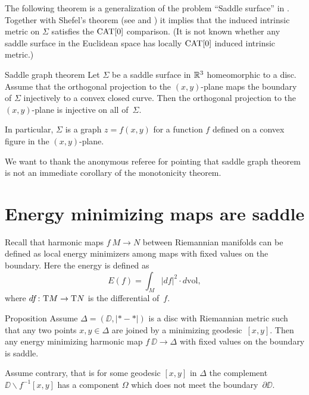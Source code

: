 \documentclass{article}
\begin{document}
The following theorem is a generalization of the problem ``Saddle surface'' in \cite{petrunin-orthodox}.
Together with Shefel's theorem (see \cite{shefel-3D} and \cite[4.5.5]{akp}) it implies that the induced 
intrinsic metric on $\Sigma$ satisfies the $\mathop{\rm CAT}\nolimits[0]$ comparison. 
(It is not known whether any saddle surface in the Euclidean space has locally $\mathop{\rm CAT}\nolimits[0]$ induced intrinsic metric.)

\begin{thm}{Saddle graph theorem}\label{cor:projection}
Let $\Sigma$ be a saddle surface in $\mathbb{R}^3$ homeomorphic to a disc.
Assume that the orthogonal projection to the $(x,y)$-plane
maps the boundary of $\Sigma$
injectively to a convex closed curve.
Then the orthogonal projection to the $(x,y)$-plane is injective on all of~$\Sigma$.

In particular, $\Sigma$ is a graph $z=f(x,y)$ for a function $f$ defined on a convex figure in the $(x,y)$-plane.
\end{thm}

\medskip

We want to thank the anonymous referee for pointing that saddle graph theorem is not an immediate corollary of the monotonicity theorem.

\section{Energy minimizing maps are saddle}

Recall that harmonic maps $f\:M\to N$ between Riemannian manifolds can be defined as local energy minimizers 
among maps with fixed values on the boundary.
Here the energy is defined as 
\[E(f)=\int_M|df|^2\cdot d\mathrm{vol},\]
where $df\colon\mathrm{T} M\to \mathrm{T} N$ is the differential of~$f$.

\begin{thm}{Proposition} 
Assume $\Delta=(\DD,|{*}-{*}|)$ is a disc with Riemannian metric such that any two points $x,y\in\Delta$ are joined by a minimizing geodesic~$[x,y]$.
Then any energy minimizing harmonic map $f\:\DD\to\Delta$ with fixed values on the boundary is saddle.
\end{thm}

Assume contrary, that is for some geodesic $[x,y]$ in $\Delta$ the complement $\DD\backslash f^{-1}[x,y]$ has a component 
$\Omega$ which does not meet the boundary~$\partial\DD$.
\end{document}
